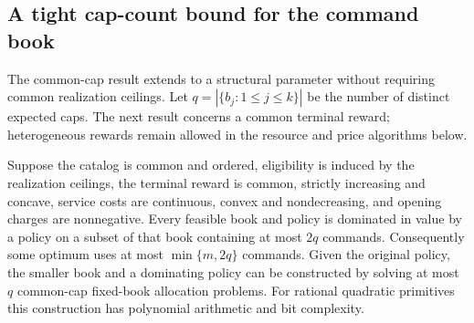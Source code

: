 \subsection{A tight cap-count bound for the command book}\label{sec:smallmenus56}
The common-cap result extends to a structural parameter without requiring common realization ceilings. Let $q=|\{b_j:1\leq j\leq k\}|$ be the number of distinct expected caps. The next result concerns a common terminal reward; heterogeneous rewards remain allowed in the resource and price algorithms below.

\begin{theorem}\label{thm:capcount56}
Suppose the catalog is common and ordered, eligibility is induced by the realization ceilings, the terminal reward is common, strictly increasing and concave, service costs are continuous, convex and nondecreasing, and opening charges are nonnegative. Every feasible book and policy is dominated in value by a policy on a subset of that book containing at most $2q$ commands. Consequently some optimum uses at most $\min\{m,2q\}$ commands. Given the original policy, the smaller book and a dominating policy can be constructed by solving at most $q$ common-cap fixed-book allocation problems. For rational quadratic primitives this construction has polynomial arithmetic and bit complexity.
\end{theorem}

